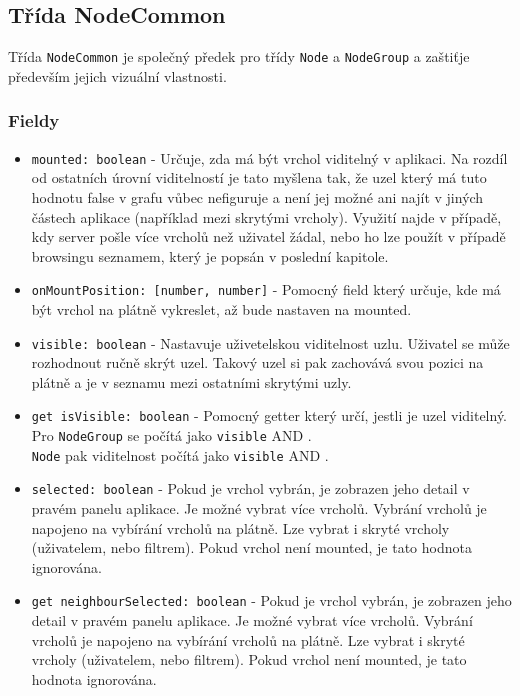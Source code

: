 \subsection{Třída NodeCommon}
Třída \texttt{NodeCommon} je společný předek pro třídy \texttt{Node} a \texttt{NodeGroup} a zaštiťje především jejich vizuální vlastnosti.

\subsubsection*{Fieldy}
\begin{itemize}
  \item \texttt{mounted: boolean} - Určuje, zda má být vrchol viditelný v aplikaci. Na rozdíl od ostatních úrovní viditelností je tato myšlena tak, že uzel který má tuto hodnotu false v grafu vůbec nefiguruje a není jej možné ani najít v jiných částech aplikace (například mezi skrytými vrcholy). Využití najde v případě, kdy server pošle více vrcholů než uživatel žádal, nebo ho lze použít v případě browsingu seznamem, který je popsán v poslední kapitole.

  \item \texttt{onMountPosition: [number, number]} - Pomocný field který určuje, kde má být vrchol na plátně vykreslet, až bude nastaven na mounted.

  \item \texttt{visible: boolean} - Nastavuje uživetelskou viditelnost uzlu. Uživatel se může rozhodnout ručně skrýt uzel. Takový uzel si pak zachovává svou pozici na plátně a je v seznamu mezi ostatními skrytými uzly.

  \item \texttt{get isVisible: boolean} - Pomocný getter který určí, jestli je uzel viditelný. \\ Pro \texttt{NodeGroup} se počítá jako \texttt{visible} AND . \\ \texttt{Node} pak viditelnost počítá jako \texttt{visible} AND .

  \item \texttt{selected: boolean} - Pokud je vrchol vybrán, je zobrazen jeho detail v pravém panelu aplikace. Je možné vybrat více vrcholů. Vybrání vrcholů je napojeno na vybírání vrcholů na plátně. Lze vybrat i skryté vrcholy (uživatelem, nebo filtrem). Pokud vrchol není mounted, je tato hodnota ignorována.

  \item \texttt{get neighbourSelected: boolean} - Pokud je vrchol vybrán, je zobrazen jeho detail v pravém panelu aplikace. Je možné vybrat více vrcholů. Vybrání vrcholů je napojeno na vybírání vrcholů na plátně. Lze vybrat i skryté vrcholy (uživatelem, nebo filtrem). Pokud vrchol není mounted, je tato hodnota ignorována.


\end{itemize}
